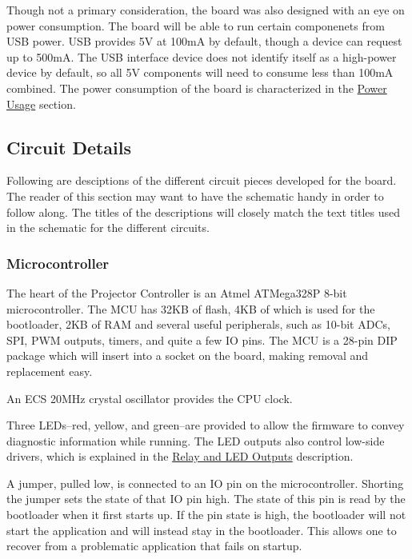 \documentclass{article}
\begin{document}
Though not a primary consideration, the board was also designed with an eye on power consumption.
The board will be able to run certain componenets from USB power.  USB provides 5V at 100mA by
default, though a device can request up to 500mA.  The USB interface device does not identify itself
as a high-power device by default, so all 5V components will need to consume less than 100mA
combined.  The power consumption of the board is characterized in the
\hyperref[ssec:PowerUsage]{Power Usage} section.

\subsection{Circuit Details} \label{ssec:CircuitDetails}
Following are desciptions of the different circuit pieces developed for the board.  The reader of
this section may want to have the schematic handy in order to follow along.  The titles of the
descriptions will closely match the text titles used in the schematic for the different circuits.

\subsubsection{Microcontroller} \label{sssec:Microcontroller}
The heart of the Projector Controller is an Atmel ATMega328P 8-bit microcontroller.  The MCU has
32KB of flash, 4KB of which is used for the bootloader, 2KB of RAM and several useful peripherals,
such as 10-bit ADCs, SPI, PWM outputs, timers, and quite a few IO pins.  The MCU is a 28-pin DIP
package which will insert into a socket on the board, making removal and replacement easy.

An ECS 20MHz crystal oscillator provides the CPU clock.

Three LEDs--red, yellow, and green--are provided to allow the firmware to convey diagnostic
information while running.  The LED outputs also control low-side drivers, which is explained in the
\hyperref[sssec:RelayLED]{Relay and LED Outputs} description.

A jumper, pulled low, is connected to an IO pin on the microcontroller.  Shorting the jumper sets
the state of that IO pin high.  The state of this pin is read by the bootloader when it first starts
up.  If the pin state is high, the bootloader will not start the application and will instead stay
in the bootloader.  This allows one to recover from a problematic application that fails on startup.
\end{document}
